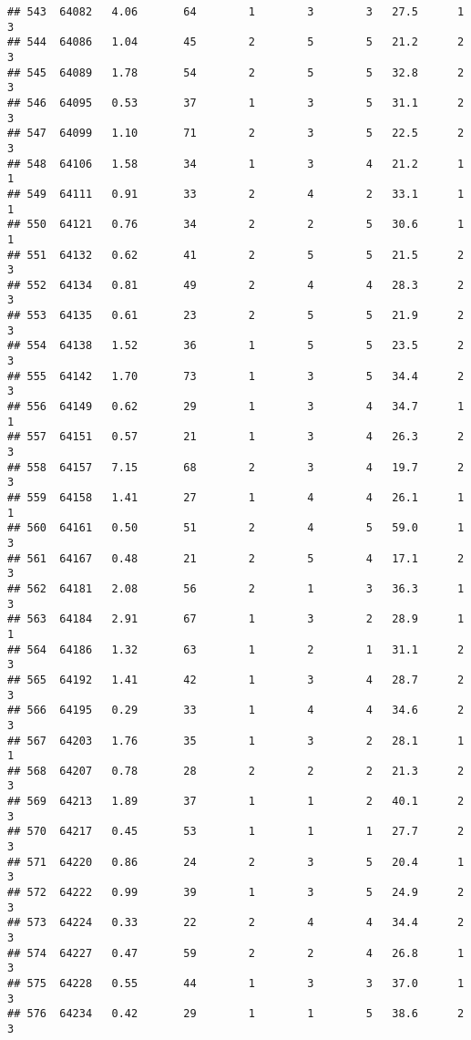 \documentclass[
]{article}
\begin{document}
\begin{verbatim}
## 543  64082   4.06       64        1        3        3   27.5      1      3
## 544  64086   1.04       45        2        5        5   21.2      2      3
## 545  64089   1.78       54        2        5        5   32.8      2      3
## 546  64095   0.53       37        1        3        5   31.1      2      3
## 547  64099   1.10       71        2        3        5   22.5      2      3
## 548  64106   1.58       34        1        3        4   21.2      1      1
## 549  64111   0.91       33        2        4        2   33.1      1      1
## 550  64121   0.76       34        2        2        5   30.6      1      1
## 551  64132   0.62       41        2        5        5   21.5      2      3
## 552  64134   0.81       49        2        4        4   28.3      2      3
## 553  64135   0.61       23        2        5        5   21.9      2      3
## 554  64138   1.52       36        1        5        5   23.5      2      3
## 555  64142   1.70       73        1        3        5   34.4      2      3
## 556  64149   0.62       29        1        3        4   34.7      1      1
## 557  64151   0.57       21        1        3        4   26.3      2      3
## 558  64157   7.15       68        2        3        4   19.7      2      3
## 559  64158   1.41       27        1        4        4   26.1      1      1
## 560  64161   0.50       51        2        4        5   59.0      1      3
## 561  64167   0.48       21        2        5        4   17.1      2      3
## 562  64181   2.08       56        2        1        3   36.3      1      3
## 563  64184   2.91       67        1        3        2   28.9      1      1
## 564  64186   1.32       63        1        2        1   31.1      2      3
## 565  64192   1.41       42        1        3        4   28.7      2      3
## 566  64195   0.29       33        1        4        4   34.6      2      3
## 567  64203   1.76       35        1        3        2   28.1      1      1
## 568  64207   0.78       28        2        2        2   21.3      2      3
## 569  64213   1.89       37        1        1        2   40.1      2      3
## 570  64217   0.45       53        1        1        1   27.7      2      3
## 571  64220   0.86       24        2        3        5   20.4      1      3
## 572  64222   0.99       39        1        3        5   24.9      2      3
## 573  64224   0.33       22        2        4        4   34.4      2      3
## 574  64227   0.47       59        2        2        4   26.8      1      3
## 575  64228   0.55       44        1        3        3   37.0      1      3
## 576  64234   0.42       29        1        1        5   38.6      2      3

\end{verbatim}
\end{document}
